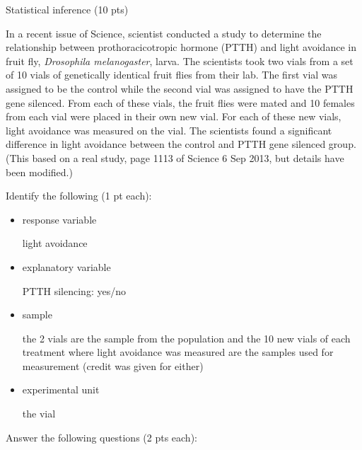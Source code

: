 \documentclass[10pt]{article}
\newcommand{\smallbrk}{\vspace*{.3in}}
\newcommand{\shortcorrect}[1]{{\color{red} #1}}
\newcommand{\shortcorrect}[1]{{\phantom{33.33}}}
\begin{document}
\newpage
\noindent \begin{Large}Statistical inference (10 pts)\end{Large}

In a recent issue of Science, scientist conducted a study to determine the relationship between prothoracicotropic hormone (PTTH) and light avoidance in fruit fly, \emph{Drosophila melanogaster}, larva. The scientists took two vials from a set of 10 vials of genetically identical fruit flies from their lab. The first vial was assigned to be the control while the second vial was assigned to have the PTTH gene silenced. From each of these vials, the fruit flies were mated and 10 females from each vial were placed in their own new vial. For each of these new vials, light avoidance was measured on the vial. The scientists found a significant difference in light avoidance between the control and PTTH gene silenced group. (This based on a real study, page 1113 of Science 6 Sep 2013, but details have been modified.) 

\smallbrk

Identify the following (1 pt each):

\begin{itemize}
\item response variable

\shortcorrect{light avoidance}

\item explanatory variable

\shortcorrect{PTTH silencing: yes/no}

\item sample

\shortcorrect{the 2 vials are the sample from the population and the 10 new vials of each treatment where light avoidance was measured are the samples used for measurement (credit was given for either)}

\item experimental unit

\shortcorrect{the vial}

\end{itemize}

Answer the following questions (2 pts each):
\end{document}
